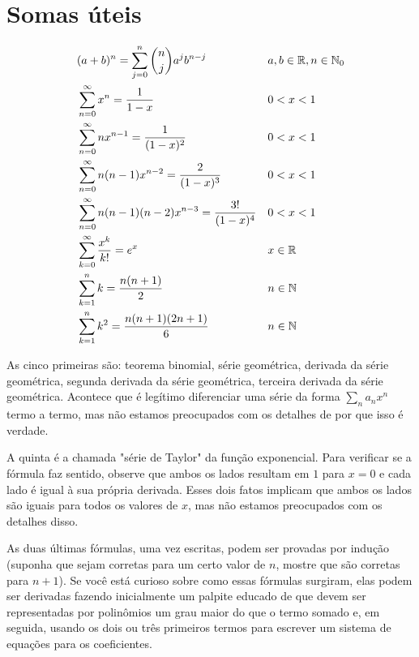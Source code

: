 


\clearpage

\appendix


\section{Somas úteis}

\begin{align*}
&
(a+b)^n = \sum_{j=0}^{n} \binom{n}{j} a^j b^{n-j}
 &&
a,b \in \mathbb{R}, n \in \mathbb{N}_0
\\
&
\sum_{n=0}^\infty x^n = \frac{1}{1-x}
 &&
0 < x < 1
\\
&
\sum_{n=0}^\infty n x^{n-1} = \frac{1}{(1-x)^2}
 &&
0 < x < 1
\\
&
\sum_{n=0}^\infty n (n-1) x^{n-2} = \frac{2}{(1-x)^3}
 &&
0 < x < 1
\\
&
\sum_{n=0}^\infty n (n-1) (n-2) x^{n-3} = \frac{3!}{(1-x)^4}
 &&
0 < x < 1
\\
&
\sum_{k=0}^\infty \frac{x^k}{k!} = e^x
 &&
x \in \mathbb{R}
\\
&
\sum_{k=1}^n k = \frac{n(n+1)}{2}
 &&
n \in \mathbb{N}
\\
&
\sum_{k=1}^n k^2 = \frac{n(n+1)(2n+1)}{6}
 &&
n \in \mathbb{N}
\end{align*}

As cinco primeiras são:
teorema binomial,
série geométrica,
derivada da série geométrica,
segunda derivada da série geométrica,
terceira derivada da série geométrica.
Acontece que é legítimo diferenciar uma série da forma $ \sum_n a_n x^n $ termo a termo, mas não estamos preocupados com os detalhes de por que isso é verdade.

A quinta é a chamada "série de Taylor" da função exponencial.
Para verificar se a fórmula faz sentido, observe que ambos os lados resultam em $ 1 $ para $ x=0 $ e cada lado é igual à sua própria derivada.
Esses dois fatos implicam que ambos os lados são iguais para todos os valores de $ x $, mas não estamos preocupados com os detalhes disso.

As duas últimas fórmulas, uma vez escritas, podem ser provadas por indução (suponha que sejam corretas para um certo valor de $ n $, mostre que são corretas para $ n+1 $).
Se você está curioso sobre como essas fórmulas surgiram, elas podem ser derivadas fazendo inicialmente um palpite educado de que devem ser representadas por polinômios um grau maior do que o termo somado e, em seguida, usando os dois ou três primeiros termos para escrever um sistema de equações para os coeficientes.

